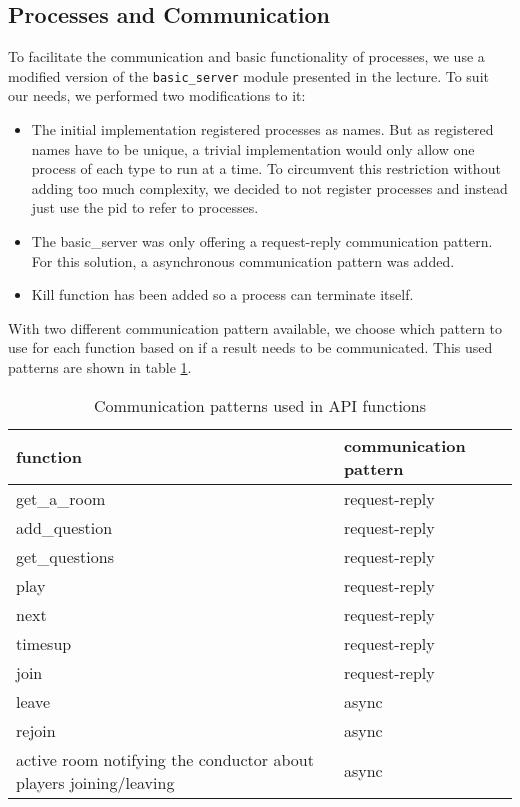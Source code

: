 \documentclass[11pt, a4paper]{article}
\begin{document}
\subsection{Processes and Communication}
To facilitate the communication and basic functionality of processes, we use a modified version of the \texttt{basic\_server} module presented in the lecture. To suit our needs, we performed two modifications to it:
\begin{itemize}
	\item The initial implementation registered processes as names. But as registered names have to be unique, a trivial implementation would only allow one process of each type to run at a time. To circumvent this restriction without adding too much complexity, we decided to not register processes and instead just use the pid to refer to processes.
	\item The basic\_server was only offering a request-reply communication pattern. For this solution, a asynchronous communication pattern was added. 
	\item Kill function has been added so a process can terminate itself. 
\end{itemize}

With two different communication pattern available, we choose which pattern to use for each function based on if a result needs to be communicated. This used patterns are shown in table \ref{tab1}.

\begin{table}[h!]
	\centering
	\caption{Communication patterns used in API functions}
	\label{tab1}
	\begin{tabular}{l|l}
		function                                                          & communication pattern \\ \hline
		get\_a\_room                                                      & request-reply         \\
		add\_question                                                     & request-reply         \\
		get\_questions                                                    & request-reply         \\
		play                                                              & request-reply         \\
		next                                                              & request-reply         \\
		timesup                                                           & request-reply         \\
		join                                                              & request-reply         \\
		leave                                                             & async                 \\
		rejoin                                                            & async                 \\
		active room notifying the conductor about players joining/leaving & async                
	\end{tabular}
\end{table}
\end{document}

